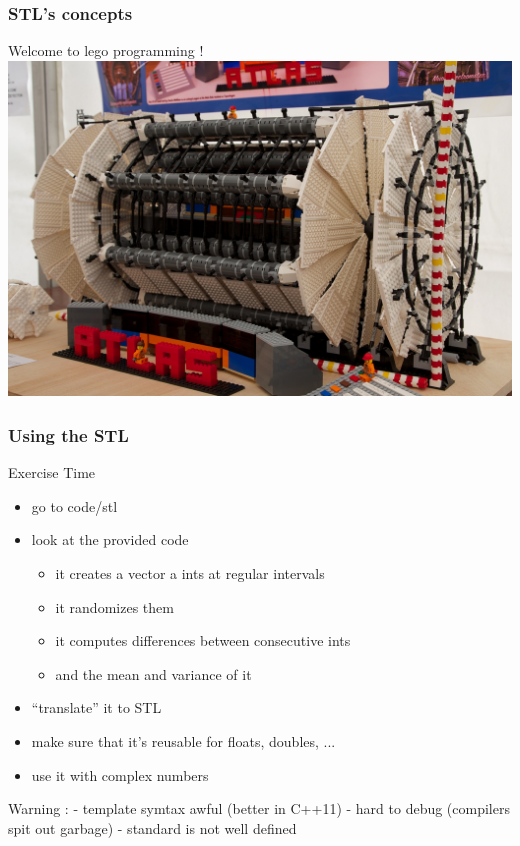 \begin{frame}[fragile]
  \frametitle{STL's concepts}
  \begin{block}{Welcome to lego programming !}
    \includegraphics[width=\linewidth]{AtlasLego}
  \end{block}
\end{frame}

\begin{frame}[fragile]
  \frametitle{Using the STL}
  \begin{alertblock}{Exercise Time}
    \begin{itemize}
    \item go to code/stl
    \item look at the provided code
      \begin{itemize}
        \item it creates a vector a ints at regular intervals
        \item it randomizes them
        \item it computes differences between consecutive ints
        \item and the mean and variance of it
      \end{itemize}
    \item ``translate'' it to STL
    \item make sure that it's reusable for floats, doubles, ...
    \item use it with complex numbers
    \end{itemize}
  \end{alertblock}
\end{frame}

Warning :
  - template symtax awful (better in C++11)
  - hard to debug (compilers spit out garbage)
  - standard is not well defined


